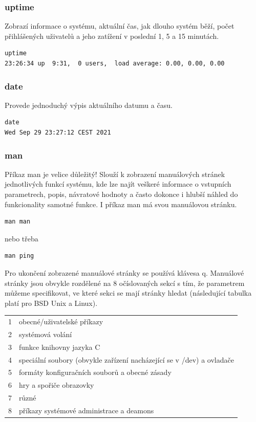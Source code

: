 \documentclass{article}
\begin{document}
\subsubsection{uptime}
Zobrazí informace o systému, aktuální čas, jak dlouho systém běží, počet přihlášených uživatelů a jeho zatížení v poslední 1, 5 a 15 minutách.
\begin{verbatim}
uptime
23:26:34 up  9:31,  0 users,  load average: 0.00, 0.00, 0.00
\end{verbatim}

\subsubsection{date}
Provede jednoduchý výpis aktuálního datumu a času.
\begin{verbatim}
date
Wed Sep 29 23:27:12 CEST 2021
\end{verbatim}

\subsubsection{man}
Příkaz man je velice důležitý! Slouží k zobrazení manuálových stránek jednotlivých funkcí systému, kde lze najít veškeré informace o vstupních parametrech, popis, návratové hodnoty a často dokonce i hlubší náhled do funkcionality samotné funkce. I příkaz man má svou manuálovou stránku.
\begin{verbatim}
man man
\end{verbatim}
nebo třeba
\begin{verbatim}
man ping
\end{verbatim}
Pro ukončení zobrazené manuálové stránky se používá klávesa q. Manuálové stránky jsou obvykle rozdělené na 8 očíslovaných sekcí s tím, že parametrem můžeme specifikovat, ve které sekci se mají stránky hledat (následující tabulka platí pro BSD Unix a Linux).

\begin{tabular}{l p{12cm}}
1 & obecné/uživatelské příkazy\\
2 & systémová volání\\
3 & funkce knihovny jazyka C\\
4 & speciální soubory (obvykle zařízení nacházející se v /dev) a ovladače\\
5 & formáty konfiguračních souborů a obecné zásady\\
6 & hry a spořiče obrazovky\\
7 & různé\\
8 & příkazy systémové administrace a deamons\\
\end{tabular}
\end{document}
